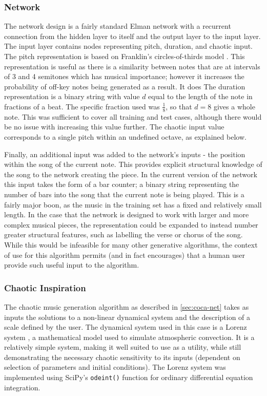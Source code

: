 \documentclass[ author={Stephen Livermore-Tozer},
				supervisor={Dr. Peter Flach},
				degree={MEng},
				title={Algorithmic Co-composition Using Machine Learning},
				subtitle={},
				type={research},
				year={2016} ]{dissertation}
\begin{document}
	\subsubsection{Network}
	
	The network design is a fairly standard Elman network with a recurrent connection from the hidden layer to itself and the output layer to the input layer. The input layer contains nodes representing pitch, duration, and chaotic input. The pitch representation is based on Franklin's circles-of-thirds model \cite{franklin2006recurrent}. This representation is useful as there is a similarity between notes that are at intervals of 3 and 4 semitones which has musical importance; however it increases the probability of off-key notes being generated as a result. It does The duration representation is a binary string with value $d$ equal to the length of the note in fractions of a beat. The specific fraction used was $\frac{1}{8}$, so that $d = 8$ gives a whole note. This was sufficient to cover all training and test cases, although there would be no issue with increasing this value further. The chaotic input value corresponds to a single pitch within an undefined octave, as explained below.
	
	Finally, an additional input was added to the network's inputs - the position within the song of the current note. This provides explicit structural knowledge of the song to the network creating the piece. In the current version of the network this input takes the form of a bar counter; a binary string representing the number of bars into the song that the current note is being played. This is a fairly major boon, as the music in the training set has a fixed and relatively small length. In the case that the network is designed to work with larger and more complex musical pieces, the representation could be expanded to instead number greater structural features, such as labelling the verse or chorus of the song. While this would be infeasible for many other generative algorithms, the context of use for this algorithm permits (and in fact encourages) that a human user provide such useful input to the algorithm.

	\subsubsection{Chaotic Inspiration}
	
	The chaotic music generation algorithm as described in \ref{sec:coca-net} takes as inputs the solutions to a non-linear dynamical system and the description of a scale defined by the user. The dynamical system used in this case is a Lorenz system \cite{lorenz1963deterministic}, a mathematical model used to simulate atmospheric convection. It is a relatively simple system, making it well suited to use as a utility, while still demonstrating the necessary chaotic sensitivity to its inputs (dependent on selection of parameters and initial conditions). The Lorenz system was implemented using SciPy's \texttt{odeint()} function for ordinary differential equation integration.
	
\end{document}
